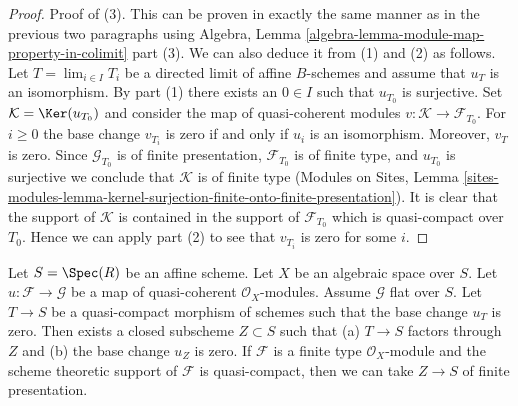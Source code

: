 \begin{proof}
\medskip\noindent
Proof of (3). This can be proven in exactly the same manner as in the
previous two paragraphs using
Algebra, Lemma \ref{algebra-lemma-module-map-property-in-colimit} part (3).
We can also deduce it from (1) and (2) as follows.
Let $T = \lim_{i \in I} T_i$ be a directed limit of affine $B$-schemes
and assume that $u_T$ is an isomorphism. By part (1) there exists
an $0 \in I$ such that $u_{T_0}$ is surjective. Set
$\mathcal{K} = \Ker(u_{T_0})$ and consider the map of quasi-coherent
modules $v : \mathcal{K} \to \mathcal{F}_{T_0}$. For $i \geq 0$ the base
change $v_{T_i}$ is zero if and only if $u_i$ is an isomorphism. Moreover,
$v_T$ is zero. Since $\mathcal{G}_{T_0}$
is of finite presentation, $\mathcal{F}_{T_0}$ is of finite type, and
$u_{T_0}$ is surjective we conclude that $\mathcal{K}$ is of finite type
(Modules on Sites, Lemma
\ref{sites-modules-lemma-kernel-surjection-finite-onto-finite-presentation}).
It is clear that the support of $\mathcal{K}$ is contained in the
support of $\mathcal{F}_{T_0}$ which is quasi-compact over $T_0$.
Hence we can apply part (2) to see that $v_{T_i}$ is zero for some $i$.
\end{proof}

\begin{lemma}
\label{lemma-F-zero-somewhat-closed}
Let $S = \Spec(R)$ be an affine scheme. Let $X$ be an algebraic space over
$S$. Let $u : \mathcal{F} \to \mathcal{G}$ be a map of quasi-coherent
$\mathcal{O}_X$-modules. Assume $\mathcal{G}$ flat over $S$. Let $T \to S$
be a quasi-compact morphism of schemes such that the base change $u_T$ is
zero. Then exists a closed subscheme $Z \subset S$ such that
(a) $T \to S$ factors through $Z$ and (b) the base change $u_Z$ is zero.
If $\mathcal{F}$ is a finite type $\mathcal{O}_X$-module and
the scheme theoretic support of $\mathcal{F}$ is quasi-compact,
then we can take $Z \to S$ of finite presentation.
\end{lemma}


